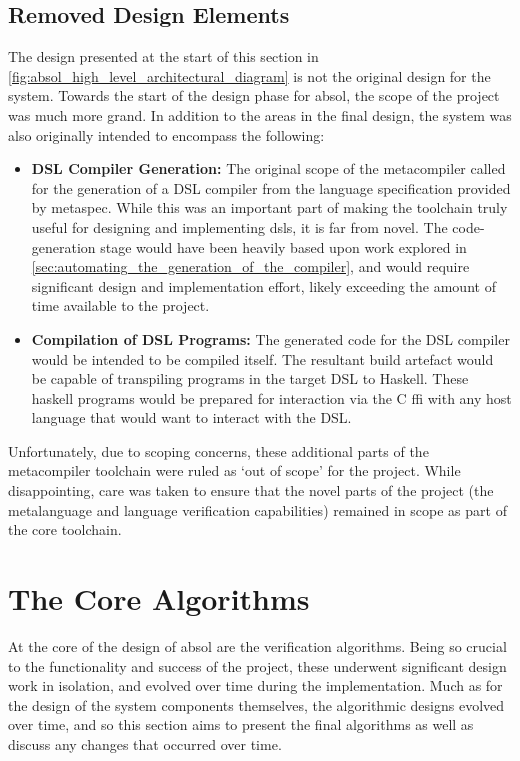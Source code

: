 \subsection{Removed Design Elements} %
\label{sub:removed_design_elements}
The design presented at the start of this section in \autoref{fig:absol_high_level_architectural_diagram} is not the original design for the system.
Towards the start of the design phase for \gls{absol}, the scope of the project was much more grand. 
In addition to the areas in the final design, the system was also originally intended to encompass the following:
\begin{itemize}
    \item \textbf{DSL Compiler Generation:} The original scope of the metacompiler called for the generation of a DSL compiler from the language specification provided by \gls{metaspec}. 
    While this was an important part of making the toolchain truly useful for designing and implementing \glspl{dsl}, it is far from novel.
    The code-generation stage would have been heavily based upon work explored in \autoref{sec:automating_the_generation_of_the_compiler}, and would require significant design and implementation effort, likely exceeding the amount of time available to the project.
    \item \textbf{Compilation of DSL Programs:} The generated code for the DSL compiler would be intended to be compiled itself. 
    The resultant build artefact would be capable of transpiling programs in the target DSL to Haskell.
    These haskell programs would be prepared for interaction via the C \gls{ffi} with any host language that would want to interact with the DSL.
\end{itemize}

Unfortunately, due to scoping concerns, these additional parts of the metacompiler toolchain were ruled as `out of scope' for the project. 
While disappointing, care was taken to ensure that the novel parts of the project (the metalanguage and language verification capabilities) remained in scope as part of the core toolchain. 



\section{The Core Algorithms} %
\label{sec:the_core_algorithms}
At the core of the design of \gls{absol} are the verification algorithms. 
Being so crucial to the functionality and success of the project, these underwent significant design work in isolation, and evolved over time during the implementation.
Much as for the design of the system components themselves, the algorithmic designs evolved over time, and so this section aims to present the final algorithms as well as discuss any changes that occurred over time. \\

